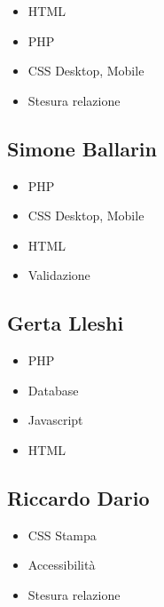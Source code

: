 \begin{itemize}
	\item HTML
	\item PHP 
	\item CSS Desktop, Mobile
	\item Stesura relazione
\end{itemize}

\subsection{Simone Ballarin}

\begin{itemize}
	\item PHP 
	\item CSS Desktop, Mobile
	\item HTML
	\item Validazione
\end{itemize}

\subsection{Gerta Lleshi}

\begin{itemize}
	\item PHP
	\item Database
	\item Javascript
	\item HTML
\end{itemize}

\subsection{Riccardo Dario}

\begin{itemize}
	\item CSS Stampa
	\item Accessibilità
	\item Stesura relazione
\end{itemize}

